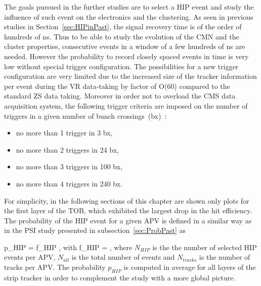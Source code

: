 The goals pursued in the further studies are to select a HIP event and study the influence of such event on the electronics and the clustering. As seen in previous studies in Section~\ref{sec:HIPinPast}, the signal recovery time is of the order of hundreds of ns. Thus to be able to study the evolution of the CMN and the cluster properties, consecutive events in a window of a few hundreds of ns are needed. However the probability to record closely spaced events in time is very low without special trigger configuration. The possibilities for a new trigger configuration are very limited due to the increased size of the tracker information per event during the VR data-taking by factor of O(60) compared to the standard ZS data taking. Moreover in order not to overload the CMS data acquisition system, the following trigger criteria are imposed on the number of triggers in a given number of bunch crossings~(bx)~\cite{website:VRtrigger}:

\begin{itemize}
\item{no more than 1 trigger in 3 bx,}
\item{no more than 2 triggers in 24 bx,}
\item{no more than 3 triggers in 100 bx,}
\item{no more than 4 triggers in 240 bx.}
\end{itemize}


For simplicity, in the following sections of this chapter are shown only plots for the first layer of the TOB, which exhibited the largest drop in the hit efficiency. The probability of the HIP event for a given APV is defined in a similar way as in the PSI study presented in subsection~\ref{sec:ProbPast} as


{
p_{HIP} = f_{HIP} ,
}
with
{
f_{HIP} = ,
}
where $N_{HIP}$ is the the number of selected HIP events per APV, $N_{all}$ is the total number of events and $N_{tracks}$ is the number of tracks per APV. The probability $p_{HIP}$ is computed in average for all layers of the strip tracker in order to complement the study with a more global picture.

